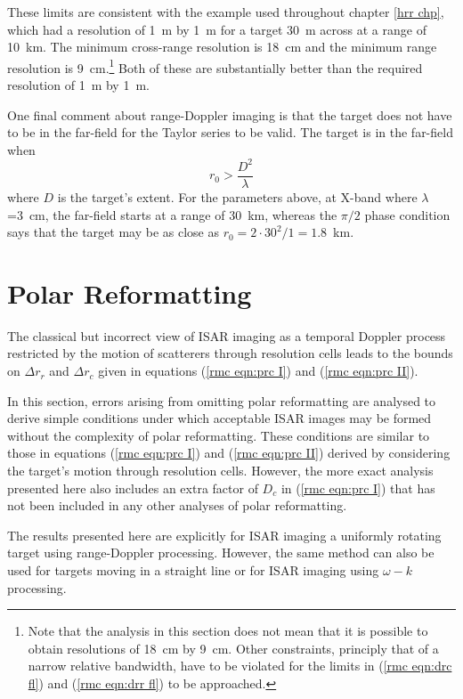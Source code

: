 These limits are consistent with the example used throughout chapter
\ref{hrr chp}, which had a resolution of 1~m by 1~m for a
target 30~m across at a range of 10~km.  The minimum cross-range resolution
is 18~cm and the minimum range resolution is 9~cm.\footnote{Note that the
analysis in this section does not mean that it is possible to obtain
resolutions of 18~cm by 9~cm.  Other constraints, principly that of a
narrow relative bandwidth, have to be violated for the limits in
(\protect\ref{rmc eqn:drc fl}) and (\protect\ref{rmc eqn:drr fl}) to be
approached.}  Both of these are substantially better than the required 
resolution of 1~m by 1~m.

One final comment about range-Doppler imaging is that the target does not
have to be in the far-field for the Taylor series to be valid.  The
target is in the far-field when
\begin{equation}
r_0>\frac{D^2}{\lambda}
\end{equation}
where $D$ is the target's extent.  For the parameters above, at X-band where
$\lambda$=3~cm, the far-field starts at a range of 30~km, whereas the
$\pi/2$ phase condition says that the target may be as close as 
$r_0=2\cdot 30^2/1=1.8$~km.

\section{Polar Reformatting}
\label{rmc sec:pr}

The classical but incorrect view of ISAR imaging as a temporal Doppler
process restricted by the motion of scatterers through resolution cells
leads to the bounds on $\Delta r_r$ and $\Delta r_c$ given in equations
(\ref{rmc eqn:prc I}) and (\ref{rmc eqn:prc II}).  

In this section, errors arising from omitting polar reformatting are
analysed to derive simple conditions under which acceptable ISAR images
may be formed without the complexity of polar reformatting.
These conditions are similar to those in equations (\ref{rmc eqn:prc I}) and 
(\ref{rmc eqn:prc II}) derived by considering the target's motion through 
resolution cells.  However, the more exact analysis presented here also
includes an extra factor of $D_c$ in (\ref{rmc eqn:prc I}) that has not been 
included in any other analyses of polar reformatting.

The results presented here are explicitly for ISAR imaging a uniformly 
rotating target using range-Doppler processing.  However, the same method
can also be used for targets moving in a straight line or for ISAR imaging
using $\omega-k$ processing.

